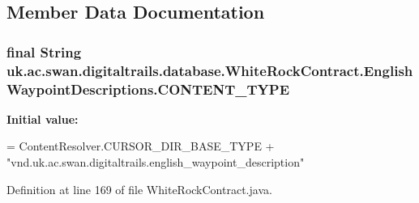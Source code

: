 \subsection{Member Data Documentation}
\hypertarget{classuk_1_1ac_1_1swan_1_1digitaltrails_1_1database_1_1_white_rock_contract_1_1_english_waypoint_descriptions_ab96f056029af68004fd9bbc3b194046c}{
\subsubsection[{C\+O\+N\+T\+E\+N\+T\+\_\+\+T\+Y\+P\+E}]{\setlength{\rightskip}{0pt plus 5cm}final String uk.\+ac.\+swan.\+digitaltrails.\+database.\+White\+Rock\+Contract.\+English\+Waypoint\+Descriptions.\+C\+O\+N\+T\+E\+N\+T\+\_\+\+T\+Y\+P\+E\hspace{0.3cm}{\ttfamily [static]}}}\label{classuk_1_1ac_1_1swan_1_1digitaltrails_1_1database_1_1_white_rock_contract_1_1_english_waypoint_descriptions_ab96f056029af68004fd9bbc3b194046c}
{\bfseries Initial value\+:}
\begin{DoxyCode}
= ContentResolver.CURSOR\_DIR\_BASE\_TYPE +
                \textcolor{stringliteral}{"vnd.uk.ac.swan.digitaltrails.english\_waypoint\_description"}
\end{DoxyCode}


Definition at line 169 of file White\+Rock\+Contract.\+java.

